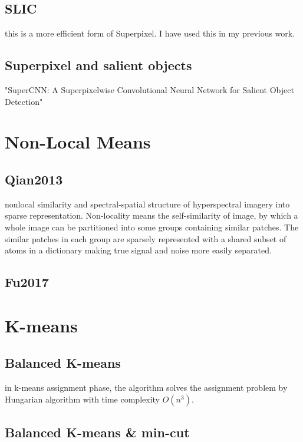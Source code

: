 \subsection{SLIC}
\cite{Achanta2012} this is a more efficient form of Superpixel. I have used this
in my previous work.

\subsection{Superpixel and salient objects}
\cite{He2015} "SuperCNN: A Superpixelwise Convolutional Neural Network for Salient Object Detection"

%
%
\newpage
\section{Non-Local Means}
\subsection{Qian2013}
\cite{Qian2013} 
nonlocal similarity and spectral-spatial structure of hyperspectral imagery into sparse representation. Non-locality means the self-similarity of image, by which a whole image can be partitioned into some groups containing similar patches. The similar patches in each group are sparsely represented with a shared subset of atoms in a dictionary making true signal and noise more easily separated.

\subsection{Fu2017}
\cite{Fu2017}

%
%
\newpage
\section{K-means}

\subsection{Balanced K-means}
\cite{Malinen2014} 
in k-means assignment phase, the algorithm solves the assignment problem by Hungarian algorithm with time complexity $O(n^3)$.

\subsection{Balanced K-means \& min-cut}
\cite{Chang2014}

